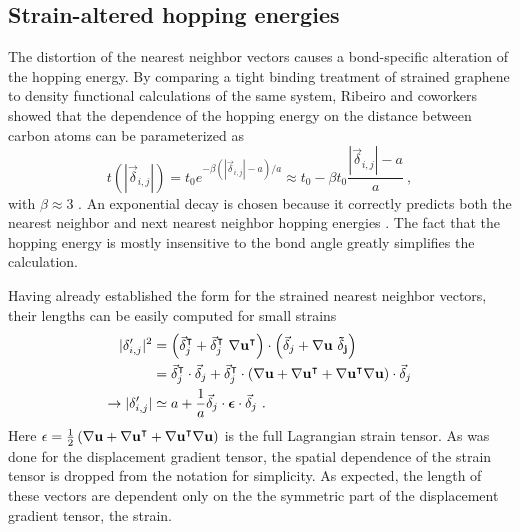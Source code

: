 \subsection{Strain-altered hopping energies}
The distortion of the nearest neighbor vectors causes a bond-specific alteration of the hopping energy.
By comparing a tight binding treatment of strained graphene to density functional calculations of the same system, Ribeiro and coworkers showed that the dependence of the hopping energy on the distance between carbon atoms can be parameterized as
\begin{equation}
  t(|\vec{\delta}_{i,j}|)=t_0 e^{-\beta (|\vec{\delta}_{i,j}|-a)/a} \approx t_0- \beta t_0 \frac{|\vec{\delta}_{i,j}|-a}{a}\ , 
  \label{eq:PVP:hopp}
\end{equation}
with $\beta\approx 3$ \cite{Ribeiro2009}.
An exponential decay is chosen because it correctly predicts both the nearest neighbor and next nearest neighbor hopping energies \cite{Pereira2009}.
The fact that the hopping energy is mostly insensitive to the bond angle greatly simplifies the calculation.

Having already established the form for the strained nearest neighbor vectors, their lengths can be easily computed for small strains
\begin{align*}
  |\delta'_{i,j}|^2&=\left(\vec{\delta}_{j}^{\intercal}+\vec{\delta}_{j}^{\intercal} \ \bf{\nabla u}^{\intercal} \right) \cdot
    \left(\vec{\delta}_{j}+\bf{\nabla u} \ \vec{\delta}_{j} \right) \\
    &=\vec{\delta}_{j}^{\intercal} \cdot \vec{\delta}_{j}+
      \vec{\delta}_{j}^{\intercal} \cdot \left(\bf{\nabla u}+\bf{\nabla u}^{\intercal}
      +\bf{\nabla u}^{\intercal}\bf{\nabla u} \right) \cdot \vec{\delta}_{j} \\
  \rightarrow |\delta'_{i,j}|&\simeq a+\frac{1}{a} \vec{\delta}_{j} \cdot \bm{\epsilon} \cdot \vec{\delta}_{j} \ .
\end{align*}
Here $\epsilon=\frac{1}{2} \left(\bf{\nabla u}+\bf{\nabla u}^{\intercal}+\bf{\nabla u}^{\intercal}\bf{\nabla u} \right)$ is the full Lagrangian strain tensor.
As was done for the displacement gradient tensor, the spatial dependence of the strain tensor is dropped from the notation for simplicity.
As expected, the length of these vectors are dependent only on the the symmetric part of the displacement gradient tensor, the strain.

